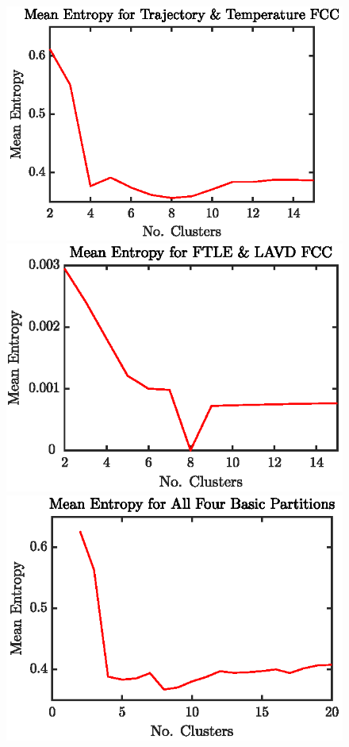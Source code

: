 \documentclass[a4paper, fontsize=12pt]{article}
\begin{document}
\begin{figure}
\begin{center}
	\includegraphics[scale = 0.98]{../figures/atlantic_ent_trajtemp.eps}%
	\includegraphics[scale=0.98]{../figures/atlantic_ent_ftlelavd.eps}
	\includegraphics[scale=0.98]{../figures/atlantic_ent_all4.eps}

\end{center}
\end{figure}
\end{document}
